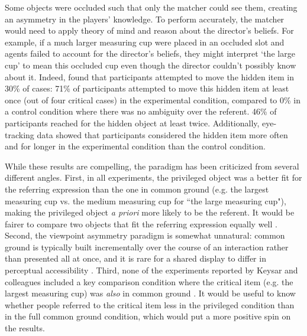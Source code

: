 \documentclass[10pt,letterpaper]{article}
\begin{document}
Some objects were occluded such that only the matcher could see them, creating an asymmetry in the players' knowledge. To perform accurately, the matcher would need to apply theory of mind and reason about the director's beliefs. For example, if a much larger measuring cup were placed in an occluded slot and agents failed to account for the director's beliefs, they might interpret `the large cup' to mean this occluded cup even though the director couldn't possibly know about it. Indeed,  found that participants attempted to move the hidden item in 30\% of cases: 71\% of participants attempted to move this hidden item at least once (out of four critical cases) in the experimental condition, compared to 0\% in a control condition where there was no ambiguity over the referent. 46\% of participants reached for the hidden object at least twice. Additionally, eye-tracking data showed that participants considered the hidden item more often and for longer in the experimental condition than the control condition. 

While these results are compelling, the paradigm has been criticized from several different angles. First, in all experiments, the privileged object was a better fit for the referring expression than the one in common ground (e.g. the largest measuring cup vs. the medium measuring cup for ``the large measuring cup"), making the privileged object \emph{a priori} more likely to be the referent. It would be fairer to compare two objects that fit the referring expression equally well \cite{HellerGrodnerTanenhaus08_Perspective}. Second, the viewpoint asymmetry paradigm is somewhat unnatural: common ground is typically built incrementally over the course of an interaction rather than presented all at once, and it is rare for a shared display to differ in perceptual accessibility \cite{HannaTanenhausTrueswell03_CommonGroundPerspective}. Third, none of the experiments reported by Keysar and colleagues included a key comparison condition where the critical item (e.g. the largest measuring cup) was \emph{also} in common ground \cite{BrownSchmidtHanna11_IncrementalPerspectiveTaking}. It would be useful to know whether people referred to the critical item less in the privileged condition than in the full common ground condition, which would put a more positive spin on the results. %
\end{document}
